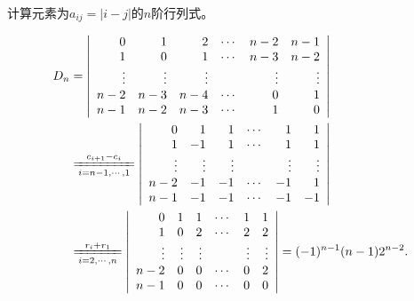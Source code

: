 \begin{li}
  计算元素为$a_{ij}=|i-j|$的$n$阶行列式。
\end{li}
\begin{jie}
  $$
  \begin{aligned}
    D_{n} &  =   \left|
      \begin{array}{rrrrrrr}
        0   & 1   & 2    & \cd & n-2  & n-1 \\ 
        1   & 0   & 1    & \cd & n-3  & n-2 \\
        \vd & \vd & \vd  &     & \vd  & \vd \\
        n-2 & n-3 & n-4  & \cd & 0     & 1 \\
        n-1 & n-2 & n-3  & \cd & 1  & 0 
      \end{array}
    \right| \\
    &   \xlongequal[i=n-1,\cd,1]{c_{i+1}-c_i}   
    \left|
      \begin{array}{rrrrrrr}
        0   & 1   & 1    & \cd & 1  & 1 \\ 
        1   & -1  & 1    & \cd & 1  & 1 \\
        \vd & \vd & \vd  &     & \vd & \vd \\
        n-2 & -1  & -1   & \cd & -1 & 1 \\
        n-1 & -1  & -1   & \cd & -1 & -1 
      \end{array}
    \right| \\
    & \xlongequal[i=2,\cd,n]{r_{i}+r_1}  
    \left|
      \begin{array}{rrrrrrr}
        0   & 1   & 1   & \cd & 1   & 1   \\ 
        1   & 0   & 2   & \cd & 2   & 2   \\
        \vd & \vd & \vd &     & \vd & \vd \\
        n-2 & 0   & 0  & \cd  & 0   & 2 \\
        n-1 & 0   & 0  & \cd  & 0   & 0 
      \end{array}
    \right| = (-1)^{n-1}(n-1)2^{n-2}.
  \end{aligned}
  $$
\end{jie}


